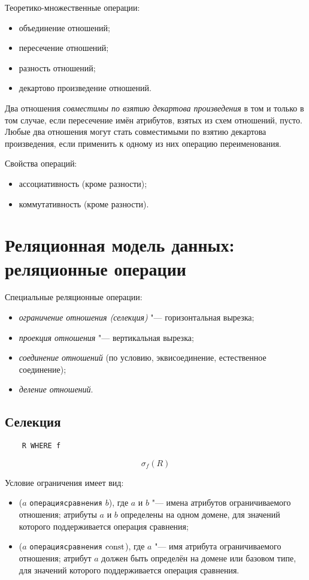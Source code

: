 Теоретико-множественные операции:
\begin{itemize}
	\item объединение отношений;
	\item пересечение отношений;
	\item разность отношений;
	\item декартово произведение отношений.
\end{itemize}

Два отношения \emph{совместимы по взятию декартова произведения} в том и только в том случае, если пересечение имён атрибутов, взятых из схем отношений, пусто.
Любые два отношения могут стать совместимыми по взятию декартова произведения, если применить к одному из них операцию переименования.

Свойства операций:
\begin{itemize}
	\item ассоциативность (кроме разности);
	\item коммутативность (кроме разности).
\end{itemize}

\section{Реляционная модель данных: реляционные операции}
\label{sec:model:operations}

Специальные реляционные операции:
\begin{itemize}
	\item \emph{ограничение отношения (селекция)} "--- горизонтальная вырезка;
	\item \emph{проекция отношения} "--- вертикальная вырезка;
	\item \emph{соединение отношений} (по условию, эквисоединение, естественное соединение);
	\item \emph{деление отношений}.
\end{itemize}

\subsection*{Селекция}

\begin{verbatim}
	R WHERE f
\end{verbatim}

$$ \sigma_f(R) $$

Условие ограничения имеет вид:
\begin{itemize}
	\item ($ a $ \texttt{операция\textunderscore сравнения} $ b $), где $ a $ и $ b $ "--- имена атрибутов ограничиваемого отношения; атрибуты $ a $ и $ b $ определены на одном домене, для значений которого поддерживается операция сравнения;
	\item ($ a $ \texttt{операция\textunderscore сравнения} $ \operatorname{const} $), где $ a $ "--- имя атрибута ограничиваемого отношения; атрибут $ a $ должен быть определён на домене или базовом типе, для значений которого поддерживается операция сравнения.
\end{itemize}

